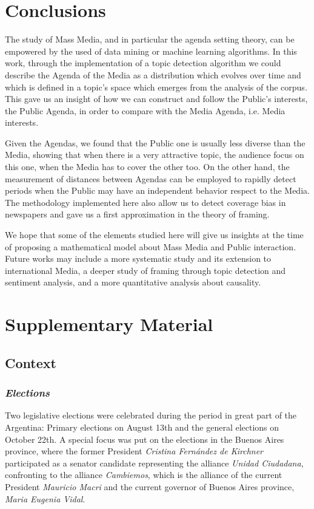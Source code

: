 \documentclass[a4paper, 12pt]{article}
\begin{document}
\section{Conclusions}

\par The study of Mass Media, and in particular the agenda setting theory, can be empowered by the used of data mining or machine learning algorithms. 
In this work, through the implementation of a topic detection algorithm we could describe the Agenda of the Media as a distribution which evolves over time and which is defined in a topic's space which emerges from the analysis of the corpus.
This gave us an insight of how we can construct and follow the Public's interests, the Public Agenda, in order to compare with the Media Agenda, i.e. Media interests. 
\par Given the Agendas, we found that the Public one is usually less diverse than the Media, showing that when there is a very attractive topic, the audience focus on this one, when the Media has to cover the other too. 
On the other hand, the measurement of distances between Agendas can be employed to rapidly detect periods when the Public may have an independent behavior respect to the Media. The methodology implemented here also allow us to detect coverage bias in newspapers and gave us a first approximation in the theory of framing. 
\par We hope that some of the elements studied here will give us insights at the time of proposing a mathematical model about Mass Media and Public interaction. Future works may include a more systematic study and its extension to international Media, a deeper study of framing through topic detection and sentiment analysis, and a more quantitative analysis about causality.


%


\newpage
\section{Supplementary Material}
\subsection{Context}
\label{sec:Context}

\subsubsection{\emph{Elections}}
\par Two legislative elections were celebrated during the period in great part of the Argentina: Primary elections on August 13th and the general elections on October 22th. 
A special focus was put on the elections in the Buenos Aires province, where the former President \emph{Cristina Fernández de Kirchner} participated as a senator candidate representing the alliance \emph{Unidad Ciudadana}, confronting to the alliance \emph{Cambiemos}, which is the alliance of the current President \emph{Mauricio Macri} and the current governor of Buenos Aires province, \emph{Maria Eugenia Vidal}.
 
\end{document}
